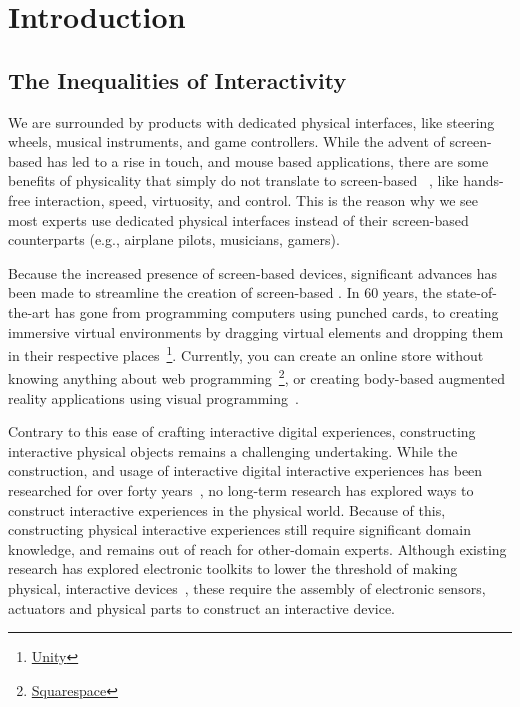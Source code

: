 \chapter{Introduction}
  \section{The Inequalities of Interactivity}
    We are surrounded by products with dedicated physical interfaces, like
    steering wheels, musical instruments, and game controllers. While the advent
    of screen-based  has led to a rise in touch, and mouse based
    applications, there are some benefits of physicality that simply do not
    translate to screen-based ~\cite{klemmer:2006}, like
    hands-free interaction, speed, virtuosity, and control. This is the reason
    why we see most experts use dedicated physical interfaces instead of their
    screen-based counterparts (e.g., airplane pilots, musicians, gamers).

    Because the increased presence of screen-based devices, significant advances
    has been made to streamline the creation of screen-based .  In 60 years, the state-of-the-art has gone from programming
    computers using punched cards, to creating immersive virtual environments by
    dragging virtual elements and dropping them in their respective
    places~\footnote{\href{https://unity.com}{Unity}}.  Currently, you can
    create an online store without knowing anything about web
    programming~\footnote{\href{https://www.squarespace.com}{Squarespace}}, or
    creating body-based augmented reality applications using visual
    programming~\cite{Pohl:2020}.

    Contrary to this ease of crafting interactive digital experiences,
    constructing interactive physical objects remains a challenging
    undertaking. While the construction, and usage of interactive digital
    interactive experiences has been researched for over forty
    years~\cite{CHI:, UIST:}, no long-term research has explored ways to
    construct interactive experiences in the physical world. Because of this,
    constructing physical interactive experiences still require significant
    domain knowledge, and remains out of reach for other-domain experts. Although
    existing research has explored electronic toolkits to lower the threshold of
    making physical, interactive devices~\cite{Greenberg:2001, Arduino:}, these
    require the assembly of electronic sensors, actuators and physical parts to
    construct an interactive device.

